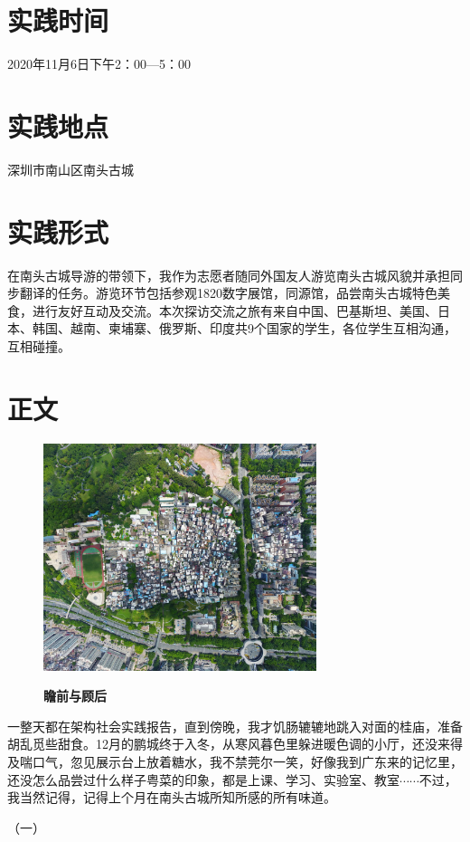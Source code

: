 \documentclass[UTF8]{ctexart}
\begin{document}
\section*{\Large 实践时间}
2020年11月6日下午2：00---5：00
\section*{\Large 实践地点}
深圳市南山区南头古城
\section*{\Large 实践形式}
在南头古城导游的带领下，我作为志愿者随同外国友人游览南头古城风貌并承担同步翻译的任务。游览环节包括参观1820数字展馆，同源馆，品尝南头古城特色美食，进行友好互动及交流。本次探访交流之旅有来自中国、巴基斯坦、美国、日本、韩国、越南、柬埔寨、俄罗斯、印度共9个国家的学生，各位学生互相沟通，互相碰撞。
\clearpage
\section*{\Large 正文}
\begin{figure}[h]
    \centering
    \includegraphics[width=8cm]{imgs/overlook.jpg}
    \begin{center}
        \Large\bfseries 瞻前与顾后
    \end{center}
\end{figure}

一整天都在架构社会实践报告，直到傍晚，我才饥肠辘辘地跳入对面的桂庙，准备胡乱觅些甜食。12月的鹏城终于入冬，从寒风暮色里躲进暖色调的小厅，还没来得及喘口气，忽见展示台上放着糖水，我不禁莞尔一笑，好像我到广东来的记忆里，还没怎么品尝过什么样子粤菜的印象，都是上课、学习、实验室、教室$\cdots \cdots$不过，我当然记得，记得上个月在南头古城所知所感的所有味道。

\begin{center}
    （一）
\end{center}
\end{document}
